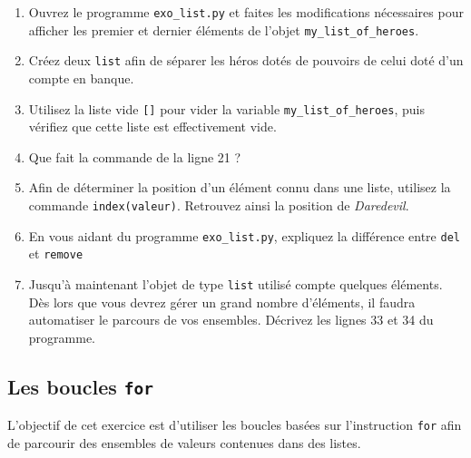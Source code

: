 \begin{enumerate}
\item  Ouvrez   le  programme  \texttt{exo\_list.py}  et   faites  les
  modifications  nécessaires pour  afficher  les premier  et  dernier
  éléments de l'objet \texttt{my\_list\_of\_heroes}.  %
\item  Créez deux  \texttt{list} afin  de séparer  les héros  dotés de
  pouvoirs de celui doté d'un compte en banque.  %
\item  Utilisez  la liste  vide  \texttt{[]}  pour vider  la  variable
  \texttt{my\_list\_of\_heroes},
  puis  vérifiez que  cette liste
  est effectivement vide.  %
\item Que fait la commande de la ligne 21 ?  %
\item  Afin de  déterminer la  position  d'un élément  connu dans  une
  liste, utilisez la commande \texttt{index(valeur)}.  Retrouvez ainsi
  la position de \textit{Daredevil}.

\item En vous aidant  du programme \texttt{exo\_list.py}, expliquez la
  différence entre \texttt{del} et \texttt{remove}

\item Jusqu'à maintenant l'objet de type \texttt{list} utilisé compte quelques
  éléments. Dès lors que vous  devrez gérer un grand nombre d'éléments,
  il faudra  automatiser le parcours  de vos ensembles.   Décrivez les
  lignes 33 et 34 du programme.
\end{enumerate}



\subsection{Les boucles  \texttt{for}}

L'objectif  de cet  exercice est  d'utiliser les  boucles basées sur
l'instruction \texttt{for} afin  de  parcourir  des  ensembles  de
valeurs  contenues  dans  des listes.



